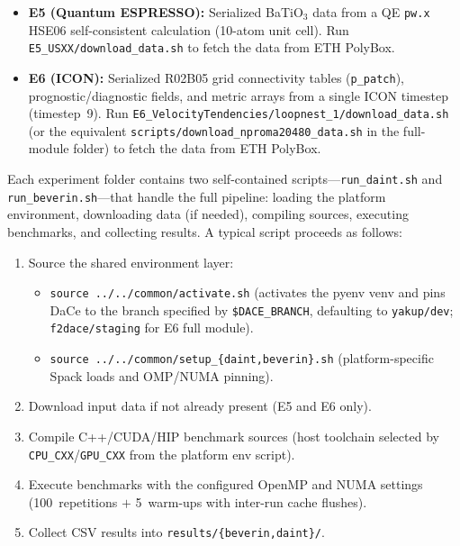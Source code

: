 \documentclass[conference]{IEEEtran}
\begin{document}
\begin{itemize}
\item \textbf{E5 (Quantum ESPRESSO):} Serialized BaTiO$_3$ data from a QE \texttt{pw.x} HSE06 self-consistent calculation (10-atom unit cell).
Run \texttt{E5\_USXX/download\_data.sh} to fetch the data from ETH PolyBox.
\item \textbf{E6 (ICON):} Serialized R02B05 grid connectivity tables (\texttt{p\_patch}), prognostic/diagnostic fields, and metric arrays from a single ICON timestep (timestep~9).
Run \texttt{E6\_VelocityTendencies/loopnest\_1/download\_data.sh} (or the equivalent \texttt{scripts/download\_nproma20480\_data.sh} in the full-module folder) to fetch the data from ETH PolyBox.
\end{itemize}


Each experiment folder contains two self-contained scripts---\texttt{run\_daint.sh} and \texttt{run\_beverin.sh}---that handle the full pipeline: loading the platform environment, downloading data (if needed), compiling sources, executing benchmarks, and collecting results.
A typical script proceeds as follows:

\begin{enumerate}
\item Source the shared environment layer:
\begin{itemize}
\item \texttt{source ../../common/activate.sh} (activates the pyenv venv and pins DaCe to the branch specified by \texttt{\$DACE\_BRANCH}, defaulting to \texttt{yakup/dev}; \texttt{f2dace/staging} for E6 full module).
\item \texttt{source ../../common/setup\_\{daint,beverin\}.sh} (platform-specific Spack loads and OMP/NUMA pinning).
\end{itemize}
\item Download input data if not already present (E5 and E6 only).
\item Compile C++/CUDA/HIP benchmark sources (host tool\-chain selected by \texttt{CPU\_CXX}/\texttt{GPU\_CXX} from the platform env script).
\item Execute benchmarks with the configured OpenMP and NUMA settings (100~repetitions $+$ 5~warm-ups with inter-run cache flushes).
\item Collect CSV results into \texttt{results/\{beverin,daint\}/}.
\end{enumerate}
\end{document}
